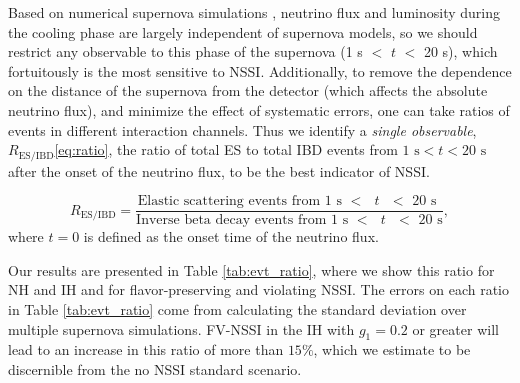 \documentclass[a4paper,12pt]{article}
\begin{document}
Based on numerical supernova simulations \cite{Nakazato:2012qf}, neutrino flux and luminosity during the cooling phase are largely independent of supernova models, so we should restrict any observable to this phase of the supernova (1 s $<$ $t$ $<$ 20 s), which fortuitously is the most sensitive to NSSI. Additionally, to remove the dependence on the distance of the supernova from the detector (which affects the absolute neutrino flux), and minimize the effect of systematic errors, one can take ratios of events in different interaction channels. Thus we identify a \textit{single observable}, $R_{\text{ES/IBD}}$\eqref{eq:ratio}, the ratio of total ES to total IBD events from $1\text{ s} < t < 20\text{ s}$ after the onset of the neutrino flux, to be the best indicator of NSSI.

\begin{equation}
R_{\text{ES/IBD}} = \frac{\text{Elastic scattering events from 1 s $<$ $t$ $<$ 20 s }}{\text{Inverse beta decay events from 1 s $<$ $t$ $<$ 20 s}},
\label{eq:ratio}
\end{equation}
where $t = 0$ is defined as the onset time of the neutrino flux. 

Our results are presented in Table \ref{tab:evt_ratio}, where we show this ratio for NH and IH and for flavor-preserving and violating NSSI. The errors on each ratio in Table \ref{tab:evt_ratio} come from calculating the standard deviation over multiple supernova simulations. FV-NSSI in the IH with $g_{1} = 0.2$ or greater will lead to an increase in this ratio of more than $15\%$, which we estimate to be discernible from the no NSSI standard scenario.
\begin{table}[t] 
\caption*{$R_{\text{ES/IBD}}\times 100\%$}
\centering
{}
\caption{$R_{\text{ES/IBD}}$\eqref{eq:ratio}, the ratio of total events detected during the late time regime ($1\text{ s} < t < 20\text{ s}$) in the elastic scattering channel to those in the inverse beta decay channel for both NH and IH cases. The ratio provides a largely model-independent signature for NSSI modifications. In this case, there is a significant difference between flavor-violating NSSI and flavor-preserving NSSI/standard in the IH case. With better ES channel statistics, such as from a liquid-Ar detector like DUNE, we expect to see much smaller statistical variation in the ratios, as well as a difference in the NH case, as predicted by the flavor history plots in Fig.~\ref{fig:fe_fp} \&~\ref{fig:fe_fv}.}
\label{tab:evt_ratio}
\end{table}
\end{document}
